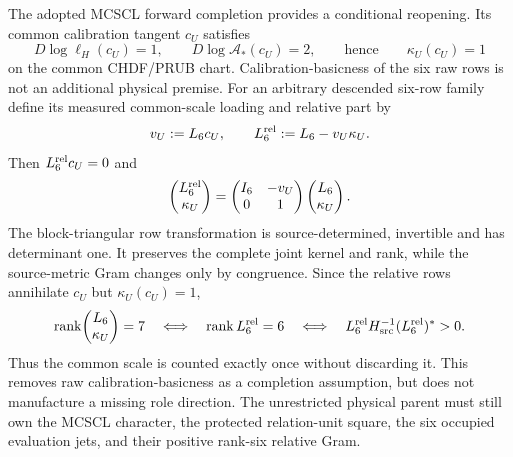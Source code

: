 The adopted MCSCL forward completion provides a conditional reopening.  Its
common calibration tangent $c_U$ satisfies
\begin{equation}
 D\log\ell_H(c_U)=1,\qquad
 D\log\mathcal A_*(c_U)=2,
 \qquad\text{hence}\qquad \kappa_U(c_U)=1
 \label{eq:p3mcsclactivation}
\end{equation}
on the common CHDF/PRUB chart.  Calibration-basicness of the six raw rows is
not an additional physical premise.  For an arbitrary descended six-row
family define its measured common-scale loading and relative part by
\begin{equation}
 v_U:=L_6c_U,\qquad L_6^{\rm rel}:=L_6-v_U\kappa_U.
 \label{eq:p3mcsclseparation}
\end{equation}
Then $L_6^{\rm rel}c_U=0$ and
\begin{equation}
 \begin{pmatrix}L_6^{\rm rel}\\\kappa_U\end{pmatrix}
 =
 \begin{pmatrix}I_6&-v_U\\0&1\end{pmatrix}
 \begin{pmatrix}L_6\\\kappa_U\end{pmatrix}.
 \label{eq:p3scalehortransform}
\end{equation}
The block-triangular row transformation is source-determined, invertible and
has determinant one.  It preserves the complete joint kernel and rank, while
the source-metric Gram changes only by congruence.  Since the relative rows
annihilate $c_U$ but $\kappa_U(c_U)=1$,
\begin{equation}
 \operatorname{rank}\!\begin{pmatrix}L_6\\\kappa_U\end{pmatrix}=7
 \quad\Longleftrightarrow\quad
 \operatorname{rank}L_6^{\rm rel}=6
 \quad\Longleftrightarrow\quad
 L_6^{\rm rel}H_{\rm src}^{-1}(L_6^{\rm rel})^*>0.
 \label{eq:p3scalehorrank}
\end{equation}
Thus the common scale is counted exactly once without discarding it.  This
removes raw calibration-basicness as a completion assumption, but does not
manufacture a missing role direction.  The unrestricted physical parent must
still own the MCSCL character, the protected relation-unit square, the six
occupied evaluation jets, and their positive rank-six relative Gram.

